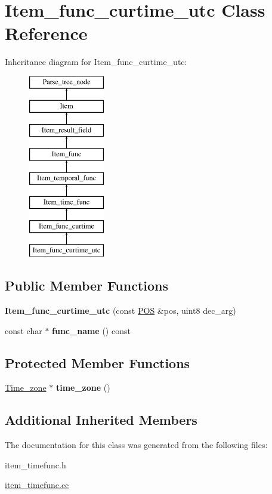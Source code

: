 \hypertarget{classItem__func__curtime__utc}{}\section{Item\+\_\+func\+\_\+curtime\+\_\+utc Class Reference}
\label{classItem__func__curtime__utc}
Inheritance diagram for Item\+\_\+func\+\_\+curtime\+\_\+utc\+:\begin{figure}[H]
\begin{center}
\leavevmode
\includegraphics[height=8.000000cm]{classItem__func__curtime__utc}
\end{center}
\end{figure}
\subsection*{Public Member Functions}
\begin{DoxyCompactItemize}
\item 
\mbox{\label{classItem__func__curtime__utc_a882db66f9d7344738a5d42e093339b0f}} 
{\bfseries Item\+\_\+func\+\_\+curtime\+\_\+utc} (const \mbox{\hyperlink{structYYLTYPE}{P\+OS}} \&pos, uint8 dec\+\_\+arg)
\item 
\mbox{\label{classItem__func__curtime__utc_a51852ce5393dc61332717958b440709f}} 
const char $\ast$ {\bfseries func\+\_\+name} () const
\end{DoxyCompactItemize}
\subsection*{Protected Member Functions}
\begin{DoxyCompactItemize}
\item 
\mbox{\label{classItem__func__curtime__utc_adafcb34c7f27047dd548475699bee719}} 
\mbox{\hyperlink{classTime__zone}{Time\+\_\+zone}} $\ast$ {\bfseries time\+\_\+zone} ()
\end{DoxyCompactItemize}
\subsection*{Additional Inherited Members}


The documentation for this class was generated from the following files\+:\begin{DoxyCompactItemize}
\item 
item\+\_\+timefunc.\+h\item 
\mbox{\hyperlink{item__timefunc_8cc}{item\+\_\+timefunc.\+cc}}\end{DoxyCompactItemize}
